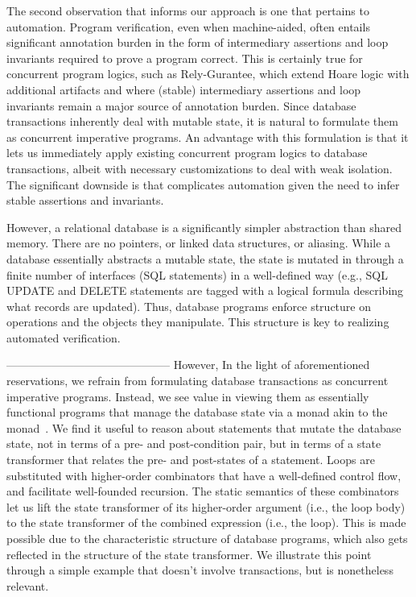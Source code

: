 The second observation that informs our approach is one that pertains
to automation. Program verification, even when machine-aided, often
entails significant annotation burden in the form of intermediary
assertions and loop invariants required to prove a program correct.
This is certainly true for concurrent program logics, such as
Rely-Gurantee, which extend Hoare logic with additional artifacts and
where (stable) intermediary assertions and loop invariants remain a
major source of annotation burden.  Since database transactions
inherently deal with mutable state, it is natural to formulate them as
concurrent imperative programs.  An advantage with this formulation is
that it lets us immediately apply existing concurrent program logics
to database transactions, albeit with necessary customizations to deal
with weak isolation. The significant downside is that complicates
automation given the need to infer stable assertions and invariants.

However, a relational database is a significantly simpler abstraction
than shared memory. There are no pointers, or linked data structures,
or aliasing. While a database essentially abstracts a mutable state,
the state is mutated in through a finite number of interfaces (SQL
statements) in a well-defined way (e.g., SQL UPDATE and DELETE
statements are tagged with a logical formula describing what records
are updated). Thus, database programs enforce structure on operations
and the objects they manipulate.  This structure is key to realizing
automated verification.


--------------------------------------------
However, In the light of aforementioned reservations, we refrain from
formulating database transactions as concurrent imperative programs.
Instead, we see value in viewing them as essentially functional
programs that manage the database state via a monad akin to the
 monad~\cite{statemonad}. We find it useful to reason about
statements that mutate the database state, not in terms of a pre- and
post-condition pair, but in terms of a state transformer that relates
the pre- and post-states of a statement. Loops are substituted with
higher-order combinators that have a well-defined control flow, and
facilitate well-founded recursion. The static semantics of these
combinators let us lift the state transformer of its higher-order
argument (i.e., the loop body) to the state transformer of the
combined expression (i.e., the loop). This is made possible due to the
characteristic structure of database programs, which also gets
reflected in the structure of the state transformer. We illustrate
this point through a simple example that doesn't involve transactions,
but is nonetheless relevant.

